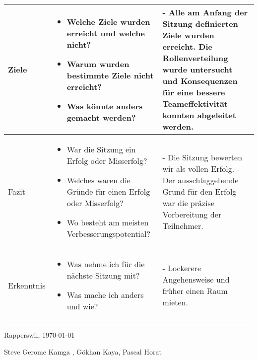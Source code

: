 \documentclass[10pt]{article}
\begin{document}
\begin{tabular}{|p{2.2cm}|p{10cm}|p{5cm}|}
Ziele & \begin{itemize} \item Welche Ziele wurden erreicht und welche nicht? \item Warum wurden bestimmte Ziele nicht erreicht? \item Was könnte anders gemacht werden?\end{itemize} & - Alle am Anfang der Sitzung definierten Ziele wurden erreicht. Die Rollenverteilung wurde untersucht und Konsequenzen für eine bessere Teameffektivität konnten abgeleitet werden.  \\ \hline
Fazit & \begin{itemize} \item War die Sitzung ein Erfolg oder Misserfolg? \item Welches waren die Gründe für einen Erfolg oder Misserfolg? \item Wo besteht am meisten Verbesserungspotential?\end{itemize} & - Die Sitzung bewerten wir als vollen Erfolg. \newline - Der ausschlaggebende Grund für den Erfolg war die präzise Vorbereitung der Teilnehmer. \\ \hline
Erkenntnis & \begin{itemize} \item Was nehme ich für die nächste Sitzung mit? \item Was mache ich anders und wie? \end{itemize} & - Lockerere Angehensweise und früher einen Raum mieten. \\ \hline

\end{tabular}

\vspace{1cm}

Rapperswil, \today

\vspace{1cm}

Steve Gerome Kamga , Gökhan Kaya, Pascal Horat
\end{document}
